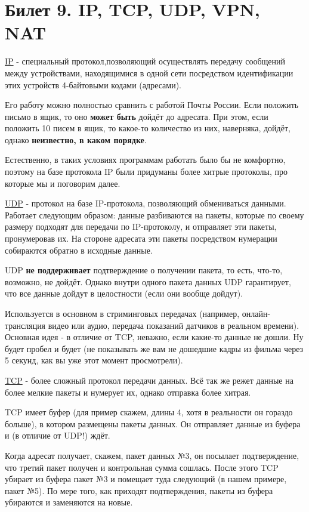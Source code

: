 \newpage
\section {Билет 9. IP, TCP, UDP, VPN, NAT}

\href{https://ru.wikipedia.org/wiki/IP}{IP} - специальный протокол,позволяющий осуществлять передачу сообщений между устройствами, находящимися в одной сети посредством идентификации этих устройств 4-байтовыми кодами (адресами).

Его работу можно полностью сравнить с работой Почты России. Если положить письмо в ящик, то оно \textbf{может быть} дойдёт до адресата. При этом, если положить 10 писем в ящик, то какое-то количество из них, наверняка, дойдёт, однако \textbf{неизвестно, в каком порядке}.

Естественно, в таких условиях программам работать было бы не комфортно, поэтому на базе протокола IP были придуманы более хитрые протоколы, про которые мы и поговорим далее.

\bigskip
\href{https://ru.wikipedia.org/wiki/UDP}{UDP} - протокол на базе IP-протокола, позволяющий обмениваться данными. Работает следующим образом: данные разбиваются на пакеты, которые по своему размеру подходят для передачи по IP-протоколу, и отправляет эти пакеты, пронумеровав их. На стороне адресата эти пакеты посредством нумерации собираются обратно в исходные данные.

UDP \textbf{не поддерживает} подтверждение о получении пакета, то есть, что-то, возможно, не дойдёт. Однако внутри одного пакета данных UDP гарантирует, что все данные дойдут в целостности (если они вообще дойдут).

Используется в основном в стриминговых передачах (например, онлайн-трансляция видео или аудио, передача показаний датчиков в реальном времени). Основная идея - в отличие от TCP, неважно, если какие-то данные не дошли. Ну будет пробел и будет (не показывать же вам не дошедшие кадры из фильма через 5 секунд, как вы уже этот момент просмотрели).

\bigskip
\href{https://ru.wikipedia.org/wiki/Transmission_Control_Protocol}{TCP} - более сложный протокол передачи данных. Всё так же режет данные на более мелкие пакеты и нумерует их, однако отправка более хитрая.

TCP имеет буфер (для пример скажем, длины 4, хотя в реальности он гораздо больше), в котором размещены пакеты данных. Он отправляет данные из буфера и (в отличие от UDP!) ждёт.

Когда адресат получает, скажем, пакет данных №3, он посылает подтверждение, что третий пакет получен и контрольная сумма сошлась. После этого TCP убирает из буфера пакет №3 и помещает туда следующий (в нашем примере, пакет №5). По мере того, как приходят подтверждения, пакеты из буфера убираются и заменяются на новые.


